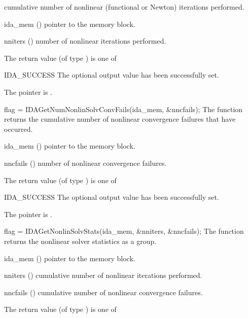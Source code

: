 {{  cumulative number of nonlinear (functional or Newton) iterations performed. 
}
{
  \begin{args}[nniters]
  \item[ida\_mem] ()
    pointer to the {\ida} memory block.
  \item[nniters] ()
    number of nonlinear iterations performed.
  \end{args}
}
{
  The return value  (of type ) is one of
  \begin{args}
  \item[IDA\_SUCCESS] 
    The optional output value has been successfully set.
  \item[\Id{IDA\_MEM\_NULL}]
    The  pointer is .
  \end{args}
}
{}
{
  flag = IDAGetNumNonlinSolvConvFails(ida\_mem, \&nncfails);
}
{
  The function  returns the
  cumulative number of nonlinear convergence failures that have occurred.
}
{
  \begin{args}[nncfails]
  \item[ida\_mem] ()
    pointer to the {\ida} memory block.
  \item[nncfails] ()
    number of nonlinear convergence failures.
  \end{args}
}
{
  The return value  (of type ) is one of
  \begin{args}
  \item[IDA\_SUCCESS] 
    The optional output value has been successfully set.
  \item[\Id{IDA\_MEM\_NULL}]
    The  pointer is .
  \end{args}
}
{}
{
  flag = IDAGetNonlinSolvStats(ida\_mem, \&nniters, \&nncfails);
}
{
  The function  returns the
  {\ida} nonlinear solver statistics as a group.
}
{
  \begin{args}[nncfails]
  \item[ida\_mem] ()
    pointer to the {\ida} memory block.
  \item[nniters] ()
    cumulative number of nonlinear iterations performed.
  \item[nncfails] ()
    cumulative number of nonlinear convergence failures.
  \end{args}
}
{
  The return value  (of type ) is one of
}}
